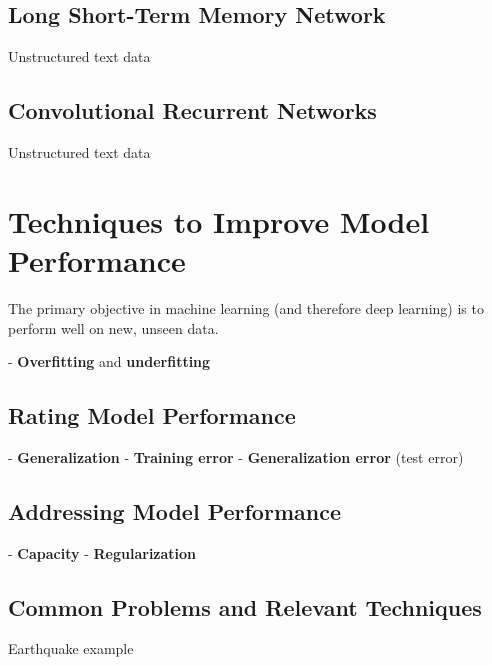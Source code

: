 \subsection{Long Short-Term Memory Network}
Unstructured text data

\subsection{Convolutional Recurrent Networks}
Unstructured text data

\section{Techniques to Improve Model Performance} %

The primary objective in machine learning (and therefore deep learning) is to perform well on new, unseen data. 

- \textbf{Overfitting} and \textbf{underfitting}

\subsection{Rating Model Performance}
- \textbf{Generalization}
- \textbf{Training error}  
- \textbf{Generalization error} (test error)

\subsection{Addressing Model Performance}
- \textbf{Capacity}
- \textbf{Regularization}

\subsection{Common Problems and Relevant Techniques}

Earthquake example